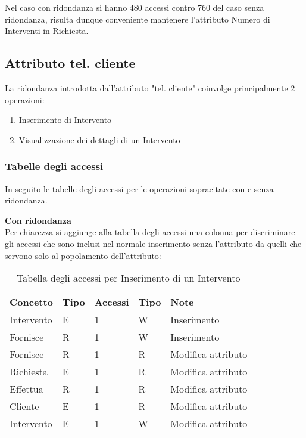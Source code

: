 \documentclass{article}
\begin{document}
Nel caso con ridondanza si hanno 480 accessi contro 760 del caso senza ridondanza, risulta dunque conveniente mantenere l'attributo Numero di Interventi in Richiesta.

\subsection{Attributo tel. cliente}

La ridondanza introdotta dall'attributo "tel. cliente" coinvolge principalmente 2 operazioni: 

\begin{enumerate}
    \item \underline{Inserimento di Intervento}
    \item \underline{Visualizzazione dei dettagli di un Intervento} 
\end{enumerate}

\subsubsection{Tabelle degli accessi}

In seguito le tabelle degli accessi per le operazioni sopracitate con e senza ridondanza.

\textbf{Con ridondanza}\\
Per chiarezza si aggiunge alla tabella degli accessi una colonna per discriminare gli accessi che sono inclusi nel normale inserimento senza l'attributo da quelli che servono solo al popolamento dell'attributo:
    
\begin{table}[h]
    \centering
        \begin{adjustbox}{width=0.8\textwidth}
            \begin{tabular}{|m{2cm}|m{2cm}|m{2cm}|m{2cm}|m{3cm}|}
                \hline  
                \textbf{Concetto} & \textbf{Tipo} & \textbf{Accessi} & \textbf{Tipo} & \textbf{Note}\\ 
                \hline
                Intervento & E & 1 & W & Inserimento \\
                \hline
                Fornisce & R & 1 & W & Inserimento \\
                \hline
                Fornisce & R & 1 & R & Modifica attributo \\
                \hline
                Richiesta & E & 1 & R & Modifica attributo \\
                \hline
                Effettua & R & 1 & R & Modifica attributo \\
                \hline
                Cliente & E & 1 & R & Modifica attributo \\
                \hline            
                Intervento & E & 1 & W & Modifica attributo \\
                \hline
            \end{tabular}
        \end{adjustbox}
    \caption{Tabella degli accessi per Inserimento di un Intervento}
    \label{tab:accesstable}
\end{table}
\end{document}
